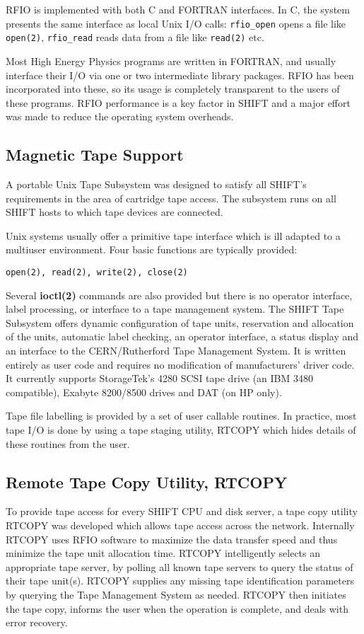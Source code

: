 RFIO is implemented with both C and FORTRAN interfaces. In C, the
system presents the same interface as local
Unix I/O calls:
{\tt rfio\_open}
opens a file like
{\tt open(2)},
{\tt rfio\_read}
reads data from a file like
{\tt read(2)}
etc.
 
Most High Energy Physics programs are written in FORTRAN, and usually
interface their I/O via one or two intermediate library packages.
RFIO has been incorporated into these, so its usage is completely
transparent to the users of these programs.
RFIO performance is a key factor in SHIFT
and a major effort was made to reduce the operating
system overheads.
 
\subsection {Magnetic Tape Support}
 
A portable Unix Tape Subsystem was designed to
satisfy all SHIFT's requirements in the area of cartridge tape access.
The subsystem runs on all SHIFT hosts to which tape devices are connected.
 
Unix systems usually offer a primitive tape interface
which is ill adapted to a multiuser environment. Four basic
functions are typically provided:
\begin{center}
{\tt open(2), read(2), write(2), close(2)}
\end{center}
 
Several
{\bf ioctl(2)}
commands are also provided but there is no operator interface,
label processing, or interface to a tape management system.
The SHIFT Tape Subsystem
offers dynamic configuration of tape
units, reservation and allocation of the units, automatic label
checking, an operator interface, a status display and an interface
to the CERN/Rutherford Tape Management System.
It is written entirely as user code and requires no
modification of manufacturers' driver code.
It currently supports StorageTek's 4280 SCSI tape
drive (an IBM 3480 compatible), Exabyte 8200/8500 drives
and DAT (on HP only).
 
Tape file labelling is provided by a set of user callable routines.
In practice, most tape I/O is done by using
a tape staging utility, RTCOPY which hides details of these
routines from the user.
\subsection {Remote Tape Copy Utility, RTCOPY}
 
To provide tape access for every SHIFT CPU and disk
server, a tape copy utility RTCOPY was developed
which allows tape access across the network.
Internally RTCOPY uses RFIO software to maximize the
data transfer speed and thus minimize the tape unit allocation time.
RTCOPY intelligently selects an appropriate tape server, by polling
all known tape servers to query the status of their tape unit(s).
RTCOPY supplies any
missing tape identification parameters by querying the Tape Management System
as needed. RTCOPY then initiates the tape copy, informs the user when the
operation is complete, and deals with error recovery.
 
